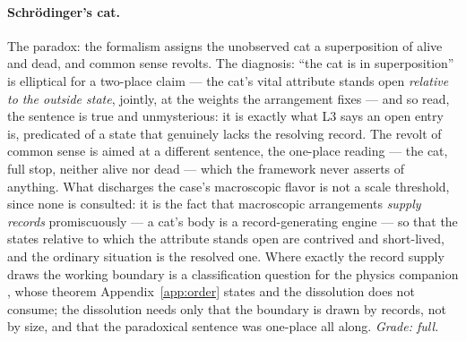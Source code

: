 \paragraph{Schr\"odinger's cat.} The paradox: the formalism assigns the unobserved cat a superposition of alive and dead, and common sense revolts. The diagnosis: ``the cat is in superposition'' is elliptical for a two-place claim --- the cat's vital attribute stands open \emph{relative to the outside state}, jointly, at the weights the arrangement fixes --- and so read, the sentence is true and unmysterious: it is exactly what L3 says an open entry is, predicated of a state that genuinely lacks the resolving record. The revolt of common sense is aimed at a different sentence, the one-place reading --- the cat, full stop, neither alive nor dead --- which the framework never asserts of anything. What discharges the case's macroscopic flavor is not a scale threshold, since none is consulted: it is the fact that macroscopic arrangements \emph{supply records} promiscuously --- a cat's body is a record-generating engine --- so that the states relative to which the attribute stands open are contrived and short-lived, and the ordinary situation is the resolved one. Where exactly the record supply draws the working boundary is a classification question for the physics companion \cite{AethusQuant}, whose theorem Appendix~\ref{app:order} states and the dissolution does not consume; the dissolution needs only that the boundary is drawn by records, not by size, and that the paradoxical sentence was one-place all along. \emph{Grade: full.}

